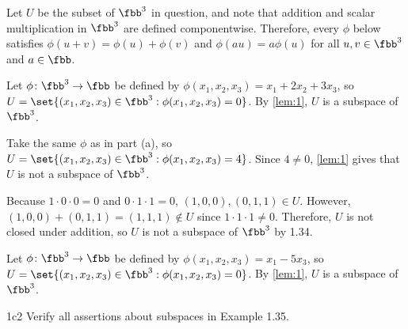 \begin{sol}
    Let $U$ be the subset of $\fbb^3$ in question, and note that addition and scalar multiplication in $\fbb^3$ are defined componentwise.
    Therefore, every $\phi$ below satisfies $\phi(u + v) = \phi(u) + \phi(v)$ and $\phi(au) = a\phi(u)$ for all $u, v \in \fbb^3$ and $a \in \fbb$.
    \begin{subexercises}
        \item Let $\phi \colon \fbb^3 \to \fbb$ be defined by $\phi(x_1, x_2, x_3) = x_1 + 2x_2 + 3x_3$, so $U = \set{(x_1, x_2, x_3) \in \fbb^3 : \phi(x_1, x_2, x_3) = 0}$.
        By \autoref{lem:1}, $U$ is a subspace of $\fbb^3$.
        \item Take the same $\phi$ as in part (a), so $U = \set{(x_1, x_2, x_3) \in \fbb^3 : \phi(x_1, x_2, x_3) = 4}$.
        Since $4 \neq 0$, \autoref{lem:1} gives that $U$ is not a subspace of $\fbb^3$.
        \item Because $1 \cdot 0 \cdot 0 = 0$ and $0 \cdot 1 \cdot 1 = 0$, $(1, 0, 0), (0, 1, 1) \in U$.
        However, $(1, 0, 0) + (0, 1, 1) = (1, 1, 1) \notin U$ since $1 \cdot 1 \cdot 1 \neq 0$.
        Therefore, $U$ is not closed under addition, so $U$ is not a subspace of $\fbb^3$ by 1.34.
        \item Let $\phi \colon \fbb^3 \to \fbb$ be defined by $\phi(x_1, x_2, x_3) = x_1 - 5x_3$, so $U = \set{(x_1, x_2, x_3) \in \fbb^3 : \phi(x_1, x_2, x_3) = 0}$.
        By \autoref{lem:1}, $U$ is a subspace of $\fbb^3$. \qedhere
    \end{subexercises}
\end{sol}

\begin{exercise}{1c2}
    Verify all assertions about subspaces in Example 1.35.
\end{exercise}

